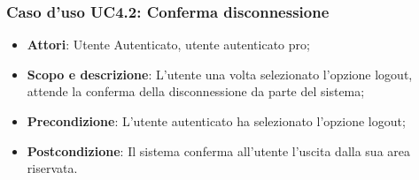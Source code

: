 \subsubsection{Caso d'uso UC4.2: Conferma disconnessione}
	\begin{itemize}
		\item
			\textbf{Attori}: Utente Autenticato, utente autenticato pro;
		\item
			\textbf{Scopo e descrizione}: L'utente una volta selezionato l'opzione logout, attende la conferma della disconnessione da parte del sistema;
 		\item
			\textbf{Precondizione}: L'utente autenticato ha selezionato l'opzione logout;
		\item
			\textbf{Postcondizione}: Il sistema conferma all'utente l'uscita dalla sua area riservata.
	\end{itemize}		
	
